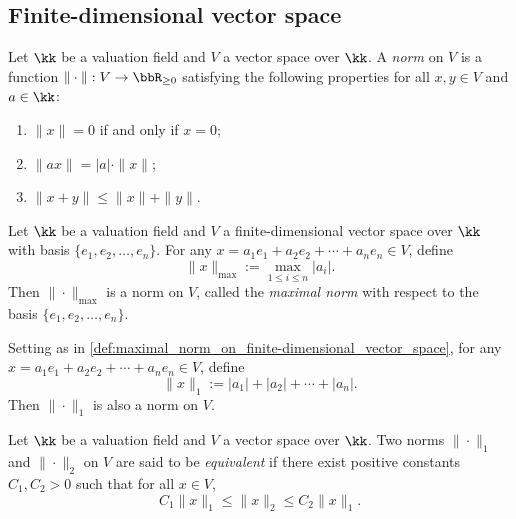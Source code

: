 
\subsection{Finite-dimensional vector space}

    \begin{definition}\label{def:norm_on_vector_space_over_valuation_field}
        Let \(\kk\) be a valuation field and \(V\) a vector space over \(\kk\).
        A \emph{norm} on \(V\) is a function \(\|\cdot\|: V \to \bbR_{\geq 0}\) satisfying the following properties for all \(x, y \in V\) and \(a \in \kk\):
        \begin{enumerate}
            \item \(\|x\| = 0\) if and only if \(x = 0\);
            \item \(\|a x\| = |a| \cdot \|x\|\);
            \item \(\|x + y\| \leq \|x\| + \|y\|\).
        \end{enumerate}
    \end{definition}

    \begin{example}\label{def:maximal_norm_on_finite-dimensional_vector_space}
        Let \(\kk\) be a valuation field and \(V\) a finite-dimensional vector space over \(\kk\) with basis \(\{e_1, e_2, \ldots, e_n\}\).
        For any \(x = a_1 e_1 + a_2 e_2 + \cdots + a_n e_n \in V\), define
        \[
            \|x\|_{\max} := \max_{1 \leq i \leq n} |a_i|.
        \]
        Then \(\|\cdot\|_{\max}\) is a norm on \(V\), called the \emph{maximal norm} with respect to the basis \(\{e_1, e_2, \ldots, e_n\}\).
    \end{example}

    \begin{example}\label{def:1-norm_no_finite-dimensional_vector_space}
        Setting as in \cref{def:maximal_norm_on_finite-dimensional_vector_space}, for any \(x = a_1 e_1 + a_2 e_2 + \cdots + a_n e_n \in V\), define
        \[
            \|x\|_1 := |a_1| + |a_2| + \cdots + |a_n|.
        \]
        Then \(\|\cdot\|_1\) is also a norm on \(V\).
    \end{example}

    \begin{definition}\label{def:equivalent_norm_on_vector_space}
        Let \(\kk\) be a valuation field and \(V\) a vector space over \(\kk\).
        Two norms \(\|\cdot\|_1\) and \(\|\cdot\|_2\) on \(V\) are said to be \emph{equivalent} if there exist positive constants \(C_1, C_2 > 0\) such that for all \(x \in V\),
        \[
            C_1 \|x\|_1 \leq \|x\|_2 \leq C_2 \|x\|_1.
        \]
    \end{definition}


